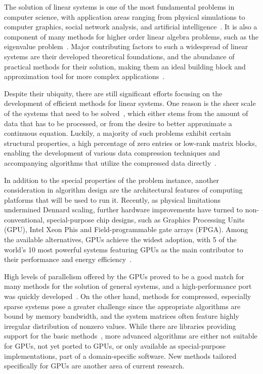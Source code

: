 The solution of linear systems is one of the most fundamental problems in
computer science, with application areas ranging from physical simulations to
computer graphics, social network analysis, and artificial
intelligence~\cite{saad,de-boor}. It is also a component of many methods
for higher order linear algebra problems, such as the eigenvalue
problem~\cite{demmel,feast}. Major contributing factors to such a widespread of
linear systems are their developed theoretical foundations, and the
abundance of practical methods for their solution, making them an ideal building
block and approximation tool for more complex applications~\cite{demmel,higham}.

Despite their ubiquity, there are still significant efforts focusing on the
development of efficient methods for linear systems. One reason is the sheer
scale of the systems that need to be solved~\cite{exascale-report}, which either
stems from the amount of data that has to be processed, or from the desire to
better approximate a continuous equation. Luckily, a majority of such problems
exhibit certain structural properties, \eg a high percentage of zero entries or
low-rank matrix blocks, enabling the development of various data compression
techniques and accompanying algorithms that utilize the compressed data
directly~\cite{saad,duff,barrettemplates,hierarchical}.

In addition to the special properties of the problem instance, another
consideration in algorithm design are the architectural features of computing
platforms that will be used to run it. Recently, as physical limitations
undermined Dennard scaling, further hardware improvements have turned to
non-conventional, special-purpose chip designs, such as Graphics Processing
Units (GPU), Intel Xeon Phis and Field-programmable gate arrays (FPGA). Among
the available alternatives, GPUs achieve the widest adoption, with 5 of the
world's 10 most powerful systems featuring GPUs as the main contributor to their
performance and energy efficiency~\cite{top500}.

High levels of parallelism offered by the GPUs proved to be a good match for
many methods for the solution of general systems, and a high-performance port was
quickly developed~\cite{magma}. On the other hand, methods for compressed,
especially sparse systems pose a greater challenge since the appropriate
algorithms are bound by memory bandwidth, and the system matrices often feature
highly irregular distribution of nonzero values. While there are libraries
providing support for the basic
methods~\cite{magma,vienna-cl,paralution,ginkgo}, more advanced algorithms are
either not suitable for GPUs, not yet ported to GPUs, or only available as
special-purpose implementations, part of a domain-specific software. New methods
tailored specifically for GPUs are another area of current research.

